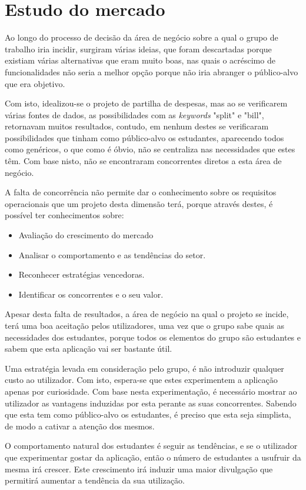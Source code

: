 \section{Estudo do mercado}

Ao longo do processo de decisão da área de negócio sobre a qual o grupo de trabalho iria incidir, surgiram várias ideias, que foram descartadas porque existiam várias alternativas que eram muito boas, nas quais o acréscimo de funcionalidades não seria a melhor opção porque não iria abranger o público-alvo que era objetivo.

Com isto, idealizou-se o projeto de partilha de despesas, mas ao se verificarem várias fontes de dados, as possibilidades com as \textit{keywords} "split" e "bill", retornavam muitos resultados, contudo, em nenhum destes se verificaram possibilidades que tinham como público-alvo os estudantes, aparecendo todos como genéricos, o que como é óbvio, não se centraliza nas necessidades que estes têm. Com base nisto, não se encontraram concorrentes diretos a esta área de negócio.

A falta de concorrência não permite dar o conhecimento sobre os requisitos operacionais que um projeto desta dimensão terá, porque através destes, é possível ter conhecimentos sobre:
\begin{itemize}
\item
Avaliação do crescimento do mercado
\item
Analisar o comportamento e as tendências do setor.
\item
Reconhecer estratégias vencedoras.
\item
Identificar os concorrentes e o seu valor.
\end{itemize}

Apesar desta falta de resultados, a área de negócio na qual o projeto se incide, terá uma boa aceitação pelos utilizadores, uma vez que o grupo sabe quais as necessidades dos estudantes, porque todos os elementos do grupo são estudantes e sabem que esta aplicação vai ser bastante útil.

Uma estratégia levada em consideração pelo grupo, é não introduzir qualquer custo ao utilizador. Com isto, espera-se que estes experimentem a aplicação apenas por curiosidade. Com base nesta experimentação, é necessário mostrar ao utilizador as vantagens induzidas por esta perante as suas concorrentes. Sabendo que esta tem como público-alvo os estudantes, é preciso que esta seja simplista, de modo a cativar a atenção dos mesmos.

O comportamento natural dos estudantes é seguir as tendências, e se o utilizador que experimentar gostar da aplicação, então o número de estudantes a usufruir da mesma irá crescer. Este crescimento irá induzir uma maior divulgação que permitirá aumentar a tendência da sua utilização.

